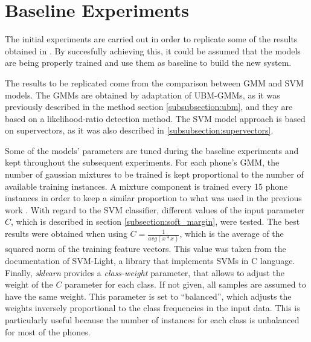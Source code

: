 
\section{Baseline Experiments}

The initial experiments are carried out in order to replicate some of
the results obtained in \cite{main}.
By succesfully achieving this, it could be assumed that the models are being properly trained
and use them as baseline to build the new system.

The results to be replicated come from the comparison between GMM and SVM models.
The GMMs are obtained by adaptation of UBM-GMMs, as it was previously described in
the method section \ref{subsubsection:ubm}, and they are based on
a likelihood-ratio detection method.
The SVM model approach is based on supervectors, as it was also described
in \ref{subsubsection:supervectors}.

Some of the models' parameters are tuned during the baseline experiments
and kept throughout the subsequent experiments.
For each phone's GMM,
the number of gaussian mixtures to be
trained
is kept proportional to the number of
available training instances. A
mixture component is trained every 15 phone instances
in order to keep a similar proportion to what was used in the previous work \cite{main}.
With regard to the SVM classifier,
different values of the input parameter $C$, which is described in section
\ref{subsection:soft_margin}, were tested. The best results were obtained when
using $C=\frac{1}{avg(x*x)}$, which is the average of the squared norm of the
training feature vectors. This value was taken from
the documentation of SVM-Light, a library
that implements SVMs in C language. Finally, \textit{sklearn} provides a
\textit{class-weight} parameter, that allows to
adjust the weight of the $C$ parameter for each class.
If not given, all samples are assumed to have the same weight.
This parameter is set to ``balanced'', which adjusts
the weights inversely proportional to the class frequencies in the input data.
This is particularly useful because the number of instances
for each class is
unbalanced for most of the phones.

